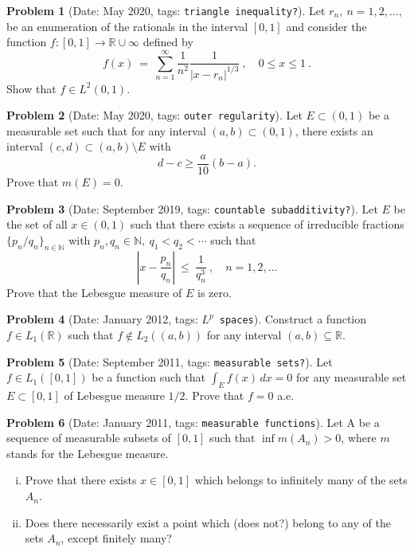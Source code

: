 \documentclass[11pt, notitlepage]{article}
\theoremstyle{definition}
\theoremstyle{definition}
\theoremstyle{definition}
\newtheorem{probstate}{Problem}
\theoremstyle{remark}
\newenvironment{problem}[2]{
    \begin{probstate}[Date: #1, tags: {\color{white} \texttt{#2}}]
}
{
  \end{probstate}
}
\newcommand{\R}{\mathbb{R}}
\begin{document}
\begin{problem}{May 2020}{triangle inequality?}
  Let $r_n, \ n=1,2,\ldots,$ be an enumeration of the rationals in the interval $[0,1]$ and consider the function  $f:[0,1]\to\mathbb{R}\cup{\infty}$ defined by
$$
f(x) \ = \ \sum_{n=1}^\infty \frac{1}{n^2}\frac{1}{|x-r_n|^{1/3}} \ , \quad 0\le x\le 1 \ .
$$
Show that $f\in L^2(0,1)$.
\end{problem}

\begin{problem}{May 2020}{outer regularity}
  Let $E \subset (0,1)$ be a measurable set such that for any interval $(a,b) \subset (0,1)$, there exists an interval $(c,d) \subset (a,b) \setminus E$ with
 \[
  d-c \ge \frac{a}{10} (b-a).
 \]
 Prove that $m(E)=0$.

\end{problem}

\begin{problem}{September 2019}{countable subadditivity?}
  Let $E$ be the set of all $x\in(0,1)$ such that there exists  a sequence of irreducible fractions
$\{p_n/q_n\}_{n\in\mathbb{N}}$ with $p_n,q_n\in\mathbb{N}, \ q_1<q_2<\cdots$ such that
$$
\left|x-\frac{p_n}{q_n}\right| \ \le \ \frac{1}{q_n^3} \ , \quad n=1,2,...
$$
Prove that the Lebesgue measure of $E$ is zero.
\end{problem}

\begin{problem}{January 2012}{$L^p$ spaces}
  Construct a function $f \in L_1(\R)$ such that $f \notin L_2((a,b))$ for any interval $(a,b) \subseteq \R$.
\end{problem}

\begin{problem}{September 2011}{measurable sets?}
  Let $f \in L_1([0,1])$ be a function such that $\int_E f (x) \, dx=0$ for any measurable set $E \subset [0,1]$ of Lebesgue measure $1/2$.
  Prove that $f=0$ a.e.
\end{problem}

\begin{problem}{January 2011}{measurable functions}
  \item Let A be a sequence of measurable subsets of $[0,1]$ such that $\inf m(A_n)>0$, where $m$ stands for the Lebesgue measure.
   \begin{enumerate}[(i)]
    \item Prove that there exists $x \in [0,1]$ which belongs to infinitely many of the sets $A_n$.
    \item Does there necessarily exist a point which {\color{red} (does not?)} belong to any of the sets $A_n$, except finitely many?
   \end{enumerate}
\end{problem}
\end{document}
